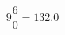 \documentclass[preview]{standalone}
\begin{document}
\begin{align*}
9 \dfrac{ 6 }{0} = 132.0
\end{align*}
\end{document}
